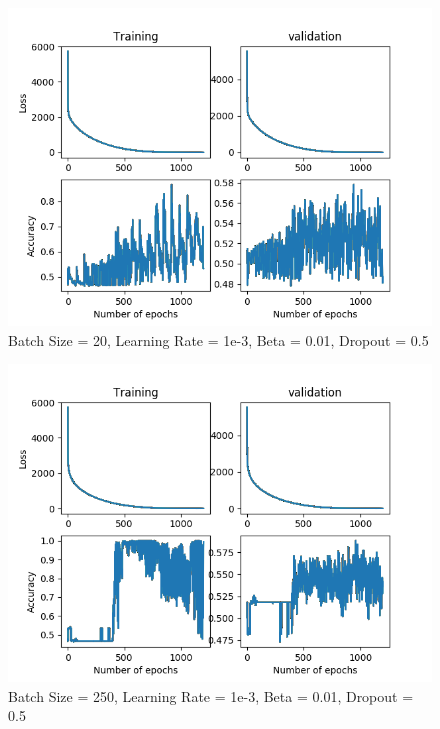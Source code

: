 \documentclass[12pt,reqno]{amsart}
\numberwithin{equation}{section}
\begin{document}
\begin{enumerate}
\begin{figure}[H]
\centering
\includegraphics[scale=0.6]{data12-1e-3-20-1e-2-5e-1}
\caption{Batch Size = 20, Learning Rate = 1e-3, Beta = 0.01, Dropout = 0.5}
\end{figure}

\begin{figure}[H]
\centering
\includegraphics[scale=0.6]{data12-1e-3-250-1e-2-5e-1}
\caption{Batch Size = 250, Learning Rate = 1e-3, Beta = 0.01, Dropout = 0.5}
\end{figure}


\end{enumerate}
\end{document}
